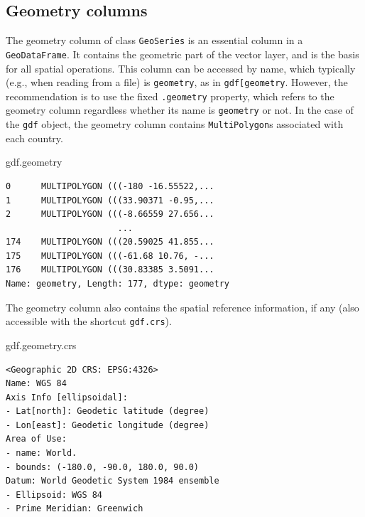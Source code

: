 \documentclass[
  letterpaper,
]{krantz}
\newenvironment{Shaded}{\begin{snugshade}}{\end{snugshade}}
\newcommand{\NormalTok}[1]{\textcolor[rgb]{0.00,0.23,0.31}{#1}}
\begin{document}
\subsection{Geometry columns}\label{sec-geometry-columns}

The geometry column of class \texttt{GeoSeries} is an essential column
in a \texttt{GeoDataFrame}. It contains the geometric part of the vector
layer, and is the basis for all spatial operations. This column can be
accessed by name, which typically (e.g., when reading from a file) is
\texttt{\textquotesingle{}geometry\textquotesingle{}}, as in
\texttt{gdf{[}\textquotesingle{}geometry\textquotesingle{}{]}}. However,
the recommendation is to use the fixed \texttt{.geometry} property,
which refers to the geometry column regardless whether its name is
\texttt{\textquotesingle{}geometry\textquotesingle{}} or not. In the
case of the \texttt{gdf} object, the geometry column contains
\texttt{\textquotesingle{}MultiPolygon\textquotesingle{}}s associated
with each country.

\begin{Shaded}
\begin{Highlighting}[]
\NormalTok{gdf.geometry}
\end{Highlighting}
\end{Shaded}

\begin{verbatim}
0      MULTIPOLYGON (((-180 -16.55522,...
1      MULTIPOLYGON (((33.90371 -0.95,...
2      MULTIPOLYGON (((-8.66559 27.656...
                      ...                
174    MULTIPOLYGON (((20.59025 41.855...
175    MULTIPOLYGON (((-61.68 10.76, -...
176    MULTIPOLYGON (((30.83385 3.5091...
Name: geometry, Length: 177, dtype: geometry
\end{verbatim}

The geometry column also contains the spatial reference information, if
any (also accessible with the shortcut \texttt{gdf.crs}).

\begin{Shaded}
\begin{Highlighting}[]
\NormalTok{gdf.geometry.crs}
\end{Highlighting}
\end{Shaded}

\begin{verbatim}
<Geographic 2D CRS: EPSG:4326>
Name: WGS 84
Axis Info [ellipsoidal]:
- Lat[north]: Geodetic latitude (degree)
- Lon[east]: Geodetic longitude (degree)
Area of Use:
- name: World.
- bounds: (-180.0, -90.0, 180.0, 90.0)
Datum: World Geodetic System 1984 ensemble
- Ellipsoid: WGS 84
- Prime Meridian: Greenwich
\end{verbatim}
\end{document}
